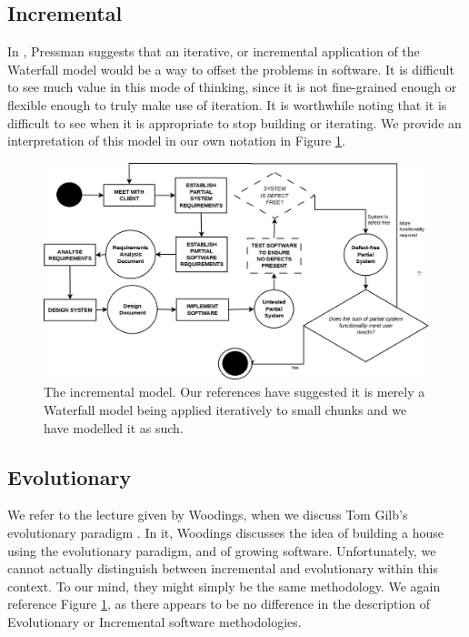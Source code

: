 \subsection{Incremental}
In \cite{pressman1992software}, Pressman suggests that an iterative, or incremental application of the
Waterfall model would be a way to offset the problems in software.
It is difficult to see much value in this mode of thinking, since it is not fine-grained enough or flexible
enough to truly make use of iteration.
It is worthwhile noting that it is difficult to see when it is appropriate to stop building or
iterating.
We provide an interpretation of this model in our own notation in Figure \ref{IncrementalFig}.

\begin{figure}
	\centering
	\includegraphics[scale=0.3]{media/Incremental}
	\caption{The incremental model. Our references have suggested it is merely a Waterfall model being
		applied iteratively to small chunks and we have modelled it as such.}
	\label{IncrementalFig}
\end{figure}

\subsection{Evolutionary}

We refer to the lecture given by Woodings, when we discuss Tom Gilb's evolutionary paradigm
\cite{Woodings2013Lecture2}.
In it, Woodings discusses the idea of building a house using the evolutionary paradigm, and of growing
software.
Unfortunately, we cannot actually distinguish between incremental and evolutionary within this
context.
To our mind, they might simply be the same methodology.
We again reference Figure \ref{IncrementalFig}, as there appears to be no difference in the
description of Evolutionary or Incremental software methodologies.

